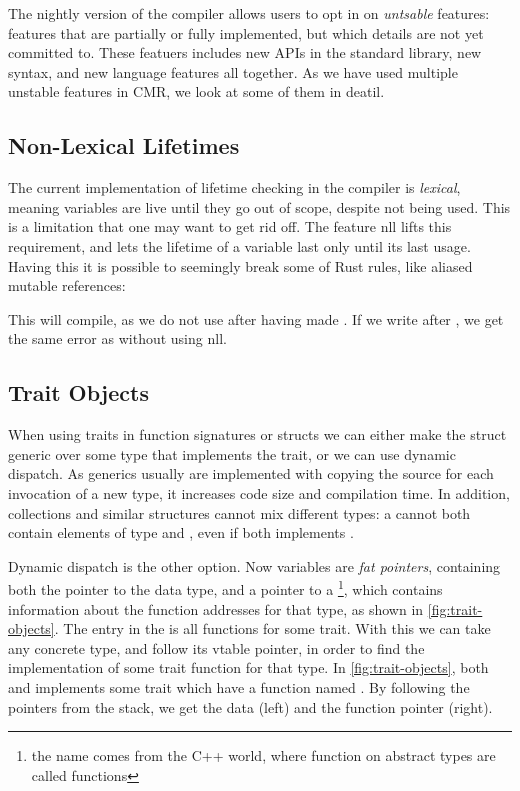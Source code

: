 The nightly version of the compiler allows users to opt in on \emph{untsable} features: features
that are partially or fully implemented, but which details are not yet committed to. These featuers
includes new APIs in the standard library, new syntax, and new language features all together.
As we have used multiple unstable features in CMR, we look at some of them in deatil.


\subsection{Non-Lexical Lifetimes\label{sec:nll}}
The current implementation of lifetime checking in the compiler is \emph{lexical}, meaning
variables are live until they go out of scope, despite not being used. This is a limitation that
one may want to get rid off. The feature \gls{nll} lifts this requirement, and lets the lifetime of
a variable last only until its last usage. Having this it is possible to seemingly break some of
Rust rules, like aliased mutable references:

This will compile, as we do not use  after having made . If we write
 after , we get the same error as without using \gls{nll}.



\subsection{Trait Objects\label{sec:trait-objects}}

When using traits in function signatures or structs we can either make the struct generic over some
type that implements the trait, or we can use dynamic dispatch. As generics usually are implemented
with copying the source for each invocation of a new type, it increases code size and compilation
time. In addition, collections and similar structures cannot mix different types: a 
cannot both contain elements of type  and , even if both implements .

Dynamic dispatch is the other option. Now variables are \emph{fat pointers}, containing both the
pointer to the data type, and a pointer to a \footnote{the name  comes from the C++ world, where function on
abstract types are called  functions}, which contains information about the function
addresses for that type, as shown in \cref{fig:trait-objects}. The entry in the  is
all functions for some trait. With this we can take any concrete type, and follow its vtable
pointer, in order to find the implementation of some trait function for that type. In
\cref{fig:trait-objects}, both  and  implements some trait which have a
function named . By following the pointers from the stack, we get the data (left) and the
function pointer (right).

